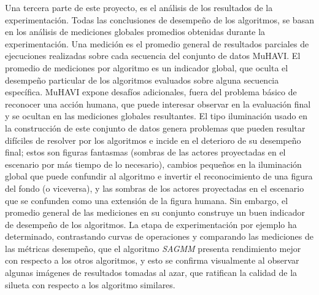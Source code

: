 Una tercera parte de este proyecto, es el análisis de los resultados de la experimentación. Todas las conclusiones de desempeño de los algoritmos, se basan en los análisis de mediciones globales promedios obtenidas durante la experimentación. Una medición es el promedio general de resultados parciales de ejecuciones realizadas sobre cada secuencia del conjunto de datos MuHAVI. El promedio de mediciones por algoritmo es un indicador global, que oculta el desempeño particular de los algoritmos evaluados sobre alguna secuencia específica. MuHAVI expone desafíos adicionales, fuera del problema básico de reconocer una acción humana, que puede interesar observar en la evaluación final y se ocultan en las mediciones globales resultantes. El tipo iluminación usado en la construcción de este conjunto de datos genera problemas que pueden resultar difíciles de resolver por los algoritmos e incide en el deterioro de su desempeño final; estos son figuras fantasmas (sombras de las actores proyectadas en el escenario por más tiempo de lo necesario), cambios pequeños en la iluminación global que puede confundir al algoritmo e invertir el reconocimiento de una figura del fondo (o viceversa), y las sombras de los actores proyectadas en el escenario que se confunden como una extensión de la figura humana. Sin embargo, el promedio general de las mediciones en su conjunto construye un buen indicador de desempeño de los algoritmos. La etapa de experimentación por ejemplo ha determinado, contrastando curvas de operaciones y comparando las mediciones de las métricas desempeño, que el algoritmo \textit{SAGMM} presenta  rendimiento mejor con respecto a los otros algoritmos, y esto se confirma visualmente al observar algunas imágenes de resultados tomadas al azar, que ratifican la calidad de la silueta con respecto a los algoritmo similares.

